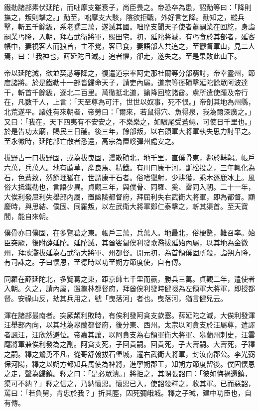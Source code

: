 \begin{pinyinscope}
 鐵勒諸部素伏延陀，而咄摩支雖衰孑，尚臣畏之。帝恐卒為患，詔勣等曰：「降則撫之，叛則擊之。」勣至，咄摩支大駭，陰欲拒戰，外好言乞降。勣知之，縱兵擊，斬五千餘級，系老孺三萬，遂滅其國。咄摩支聞天子使者蕭嗣業在回紇，身詣嗣業丐降，入朝，拜右武衛將軍，賜田宅。初，延陀將滅，有丐食於其部者，延客帳中，妻視客人而狼首，主不覺，客已食，妻語部人共追之，至鬱督軍山，見二人焉，曰：「我神也，薛延陀且滅。」追者懼，卻走，遂失之。至是果敗此山下。



 帝以延陀滅，欲並契苾等降之，復遣道宗率阿史那社爾等分部窮討，帝幸靈州，節度諸將。於是鐵勒十一部皆歸命天子，請吏內屬。道宗等徑磧擊延陀餘眾阿波達干，斬首千餘級，逐北二百里。萬徹抵北道，諭降回紇諸酋。虜所遣使踵及帝行在，凡數千人，上言：「天至尊為可汗，世世以奴事，死不恨。」帝剖其地為州縣，北荒遂平。諸姓有來朝者，帝勞曰：「爾來，若鼠得穴、魚得泉，我為爾深廣之。」又曰：「我在，天下四夷有不安安之，不樂樂之，如驥尾受蒼蠅，可使日千里也。」於是告功太廟，賜民三日酺。後三年，餘部叛，以右領軍大將軍執失思力討平之。至永徽時，延陀部亡散者悉還，高宗為置嵠彈州處安之。



 拔野古一曰拔野固，或為拔曳固，漫散磧北，地千里，直僕骨東，鄰於靺鞨。帳戶六萬，兵萬人。地有薦草，產良馬、精鐵。有川曰康干河，斷松投之，三年輒化為石，色蒼致，然節理猶在，世謂康干石者。俗嗜獵射，少耕獲，乘木逐鹿冰上。風俗大抵鐵勒也，言語少異。貞觀三年，與僕骨、同羅、奚、霫同入朝。二十一年，大俟利發屈利失舉部內屬，置幽陵都督府，拜屈利失右武衛大將軍，即為都督。顯慶時，與思結、僕固、同羅叛，以左武衛大將軍鄭仁泰擊之，斬其渠首。至天寶間，能自來朝。



 僕骨亦曰僕固，在多覽葛之東。帳戶三萬，兵萬人。地最北，俗梗驁，難召率。始臣突厥，後附薛延陀。延陀滅，其酋娑匐俟利發歌濫拔延始內屬，以其地為金微州，拜歌濫拔延為右武衛大將軍、州都督。開元初，為首領僕固所殺，詣朔方降，有司誅之。子曰懷恩，至德時以功至朔方節度使，自有傳。



 同羅在薛延陀北，多覽葛之東，距京師七千里而贏，勝兵三萬。貞觀二年，遣使者入朝。久之，請內屬，置龜林都督府，拜酋俟利發時健啜為左領軍大將軍，即授都督。安祿山反，劫其兵用之，號「曳落河」者也。曳落河，猶言健兒云。



 渾在諸部最南者。突厥頡利敗時，有俟利發阿貪支款塞。薛延陀之滅，大俟利發渾汪舉部內向，以其地為皋蘭都督府，後分東、西州。太宗以阿貪支於汪屬尊，遣譯者諷汪，汪欣然避位。帝嘉其讓，以阿貪支為右領軍衛大將軍、皋蘭州刺史，汪雲麾將軍兼俟利發為之副。阿貪支死，子回貴嗣。回貴死，子大壽嗣。大壽死，子釋之嗣。釋之鷙勇不凡，從哥舒翰拔石堡城，遷右武衛大將軍，封汝南郡公。李光弼保河陽，釋之以朔方都知兵馬使為裨將，進寧朔郡王，知朔方節度留後。僕固懷恩之走，聲為歸鎮。釋之曰：「是必眾潰。」將拒之，其甥張韶曰：「彼如悔禍還鎮，渠可不納？」釋之信之，乃納懷恩。懷恩已入，使韶殺釋之，收其軍。已而惡韶，罵曰：「若負舅，肯忠於我？」折其脛，囚死彌峨城。釋之子瑊，建中功臣也，自有傳。




\end{pinyinscope}
